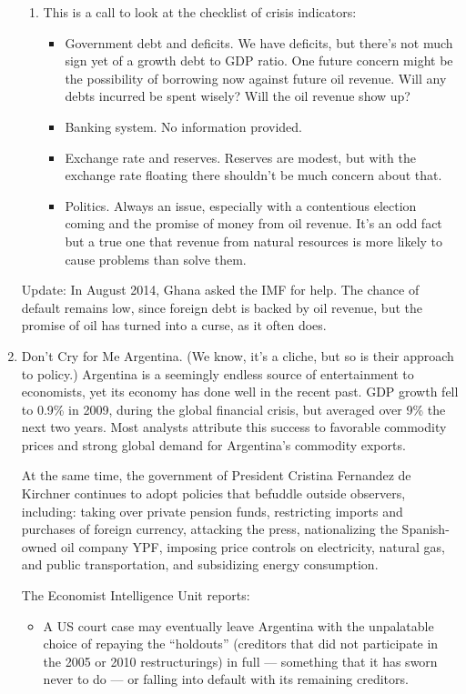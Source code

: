 \begin{enumerate}
\begin{enumerate}
\item This is a call to look at the checklist of crisis indicators:
\begin{itemize}
\item Government debt and deficits.
We have deficits, but there's not
much sign yet of a growth debt to GDP ratio.
One future concern might be the possibility of borrowing now against future oil
revenue.  Will any debts incurred be spent wisely?
Will the oil revenue show up?
\item Banking system.  No information provided.
\item Exchange rate and reserves.  Reserves are modest,
but with the exchange rate floating there shouldn't be much
concern about that.
\item Politics.  Always an issue,
especially with a contentious election coming
and the promise of money from oil revenue.
It's an odd fact but a true one that revenue
from natural resources is more likely to cause problems than solve them.
\end{itemize}
\end{enumerate}
Update:  In August 2014, Ghana asked the IMF for help.
The chance of default remains low, since foreign debt is backed by  oil revenue,
but the promise of oil has turned into a curse,
as it often does.



\item Don't Cry for Me Argentina.  
(We know, it's a cliche, but so is their approach to policy.)
Argentina is a seemingly endless source of entertainment to economists,
yet its economy has done well in the recent past.
GDP growth fell to 0.9\% in 2009, during the global financial crisis,
but averaged over 9\% the next two years.
Most analysts attribute this success to
favorable commodity prices and strong global demand for Argentina's commodity exports.

At the same time, the government of President Cristina Fernandez de Kirchner
continues to adopt policies that befuddle outside observers, including:
taking over private pension funds,
restricting imports and purchases of foreign currency,
attacking the press,
nationalizing the Spanish-owned oil company YPF,
imposing price controls on electricity, natural gas, and public transportation,
and subsidizing energy consumption.

The Economist Intelligence Unit reports:
\begin{itemize}
\item A US court case may eventually leave
Argentina with the unpalatable choice of repaying the ``holdouts'' (creditors that
did not participate in the 2005 or 2010 restructurings) in full --- something that it
has sworn never to do --- or falling into default with its remaining creditors.  


\end{itemize}
\end{enumerate}
